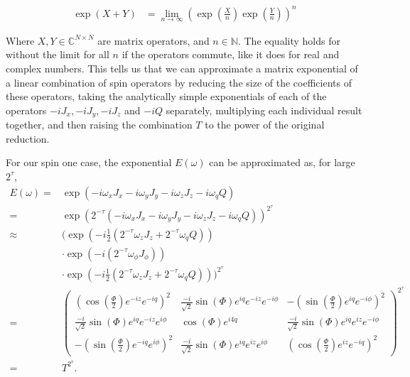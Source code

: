 \documentclass{jors}
\begin{document}
		\begin{align}
			\exp\left( X + Y\right) &= \lim_{n\to\infty} \left(\exp\left(\frac{X}{n}\right) \exp\left(\frac{Y}{n}\right)\right)^n
		\end{align}
		
		Where \(X,Y\in\mathbb{C}^{N\times N}\) are matrix operators, and \(n\in\mathbb{N}\).
		The equality holds for without the limit for all \(n\) if the operators commute, like it does for real and complex numbers.
		This tells us that we can approximate a matrix exponential of a linear combination of spin operators by reducing the size of the coefficients of these operators, taking the analytically simple exponentials of each of the operators \(-iJ_x, -iJ_y, -iJ_z\) and \(-iQ\) separately, multiplying each individual result together, and then raising the combination \(T\) to the power of the original reduction.
		
		For our spin one case, the exponential \(E(\omega)\) can be approximated as, for large \(2^\tau\),
		\begin{align}
			E(\omega) =& \exp\left(-i\omega_x J_x - i\omega_y J_y - i\omega_z J_z - i\omega_q Q\right)\\
			=& \exp\left(2^{-\tau}\left(-i\omega_x J_x - i\omega_y J_y - i\omega_z J_z - i\omega_q Q\right)\right)^{2^\tau}\\
			\approx& \biggl(\exp\left(-i\frac12\left(2^{-\tau} \omega_z J_z + 2^{-\tau}\omega_q Q\right)\right)\nonumber\\
			&\cdot\exp\left(-i\left(2^{-\tau} \omega_\phi J_\phi\right)\right)\nonumber\\
			&\cdot\exp\left(-i\frac12\left(2^{-\tau} \omega_z J_z + 2^{-\tau} \omega_q Q\right)\right)\biggr)^{2^\tau}\\
			=& \begin{pmatrix}
				\left(\cos\left(\frac{\Phi}{2}\right) e^{-iz}e^{-iq}\right)^2 & \frac{-i}{\sqrt{2}} \sin(\Phi)e^{iq}e^{-iz}e^{-i\phi} & -\left(\sin\left(\frac{\Phi}{2}\right)e^{iq}e^{-i\phi}\right)^2\\
				\frac{-i}{\sqrt{2}} \sin(\Phi)e^{iq}e^{-iz}e^{i\phi} & \cos(\Phi)e^{i4q} & \frac{-i}{\sqrt{2}} \sin(\Phi)e^{iq}e^{iz}e^{-i\phi}\\
				-\left(\sin\left(\frac{\Phi}{2}\right)e^{-iq}e^{i\phi}\right)^2 & \frac{-i}{\sqrt{2}} \sin(\Phi)e^{iq}e^{iz}e^{i\phi} & \left(\cos\left(\frac{\Phi}{2}\right) e^{iz}e^{-iq}\right)^2
			\end{pmatrix}^{2^\tau}\\
			=& T^{2^\tau}.
		\end{align}
\end{document}
